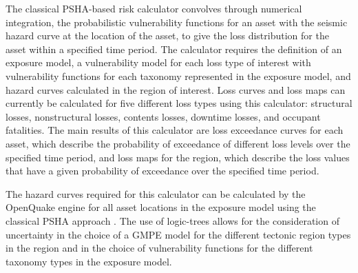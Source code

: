 The classical PSHA-based risk calculator convolves through numerical integration, the probabilistic vulnerability functions for an asset with the seismic hazard curve at the location of the asset, to give the loss distribution for the asset within a specified time period. The calculator requires the definition of an exposure model, a vulnerability model for each loss type of interest with vulnerability functions for each taxonomy represented in the exposure model, and hazard curves calculated in the region of interest. Loss curves and loss maps can currently be calculated for five different loss types using this calculator: structural losses, nonstructural losses, contents losses, downtime losses, and occupant fatalities. The main results of this calculator are loss exceedance curves for each asset, which describe the probability of exceedance of different loss levels over the specified time period, and loss maps for the region, which describe the loss values that have a given probability of exceedance over the specified time period.

The hazard curves required for this calculator can be calculated by the OpenQuake engine for all asset locations in the exposure model using the classical PSHA approach \citep{cornell1968, mcguire1976}. The use of logic-trees allows for the consideration of uncertainty in the choice of a GMPE model for the different tectonic region types in the region and in the choice of vulnerability functions for the different taxonomy types in the exposure model.
